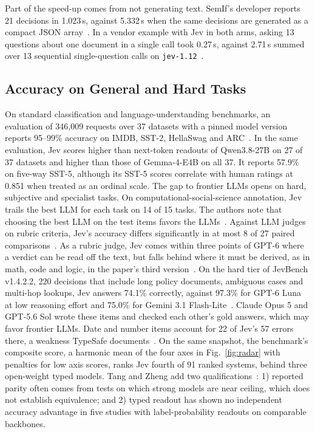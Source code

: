 Part of the speed-up comes from not generating text. SemIf's developer reports 21 decisions in 1.023\,s, against 5.332\,s when the same decisions are generated as a compact JSON array~\cite{lee2026semif}. In a vendor example with Jev in both arms, asking 13 questions about one document in a single call took 0.27\,s, against 2.71\,s summed over 13 sequential single-question calls on \texttt{jev-1.12}~\cite{typesafe2026docs}.

\subsection{Accuracy on General and Hard Tasks}

On standard classification and language-understanding benchmarks, an evaluation of 346{,}009 requests over 37 datasets with a pinned model version reports 95--99\% accuracy on IMDB, SST-2, HellaSwag and ARC~\cite{deusser2026evaluating}. In the same evaluation, Jev scores higher than next-token readouts of Qwen3.8-27B on 27 of 37 datasets and higher than those of Gemma-4-E4B on all 37. It reports 57.9\% on five-way SST-5, although its SST-5 scores correlate with human ratings at 0.851 when treated as an ordinal scale. The gap to frontier LLMs opens on hard, subjective and specialist tasks. On computational-social-science annotation, Jev trails the best LLM for each task on 14 of 15 tasks. The authors note that choosing the best LLM on the test items favors the LLMs~\cite{ibrahim2026evaluating}. Against LLM judges on rubric criteria, Jev's accuracy differs significantly in at most 8 of 27 paired comparisons~\cite{rao2026jev}. As a rubric judge, Jev comes within three points of GPT-6 where a verdict can be read off the text, but falls behind where it must be derived, as in math, code and logic, in the paper's third version~\cite{li2026jev}. On the hard tier of JevBench v1.4.2.2, 220 decisions that include long policy documents, ambiguous cases and multi-hop lookups, Jev answers 74.1\% correctly, against 97.3\% for GPT-6 Luna at low reasoning effort and 75.0\% for Gemini 3.1 Flash-Lite~\cite{jevbench2026v1422}. Claude Opus 5 and GPT-5.6 Sol wrote these items and checked each other's gold answers, which may favor frontier LLMs. Date and number items account for 22 of Jev's 57 errors there, a weakness TypeSafe documents~\cite{typesafe2026docs}. On the same snapshot, the benchmark's composite score, a harmonic mean of the four axes in Fig.~\ref{fig:radar} with penalties for low axis scores, ranks Jev fourth of 91 ranked systems, behind three open-weight typed models. Tang and Zheng add two qualifications~\cite{tang2026typed}: 1) reported parity often comes from tests on which strong models are near ceiling, which does not establish equivalence; and 2) typed readout has shown no independent accuracy advantage in five studies with label-probability readouts on comparable backbones.

